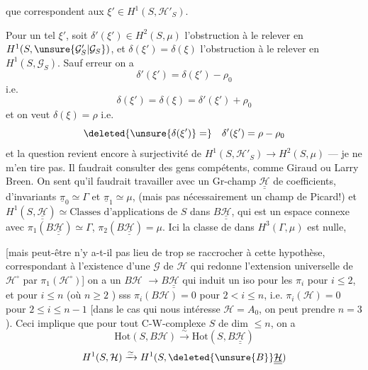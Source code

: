 que  correspondent  aux
$\xi'\in H^1(S,\mathcal H'_S)$.

Pour un tel  $\xi'$, soit
$\delta'(\xi')\in H^2(S,\mu)$
l'obstruction à le relever en $H^1(S,\unsure{\mathcal G'_S|\mathcal G_S})$,
et $\delta(\xi')=\delta(\xi)$ l'obstruction à le relever
en $H^1(S,\mathcal G_S)$. Sauf erreur on a
\[
\delta'(\xi')=\delta(\xi')-\rho_0
\]
i.e.
\[
\delta(\xi')=\delta(\xi)=\delta'(\xi')+\rho_0
\]
et on veut $\delta(\xi)=\rho$ i.e.
\[
\deleted{\unsure{\delta(\xi')}=}\quad
\delta'(\xi')=\rho-\rho_0
\]
et la question revient encore à  
surjectivité de $H^1(S,\mathcal H'_S)\longrightarrow H^2(S,\mu)$
--- je ne m'en tire pas. Il faudrait
consulter des gens compétents, comme
Giraud ou Larry Breen. On sent qu'il
faudrait travailler avec un Gr-champ $\underline{\underline{\mathcal H}}$
de coefficients, d'invariants $\underline{\pi}_0\simeq\Gamma$ et
$\underline{\pi}_1\simeq\mu$,
(mais pas nécessairement un champ de Picard!)
 et
$H^1(S,\underline{\underline{\mathcal H}})\simeq\text{Classes d'applications}$
de $S$ dans $B\underline{\underline{\mathcal H}}$, qui est un espace
connexe avec $\pi_1(B\underline{\underline{\mathcal H}})\simeq\Gamma$,
$\pi_2(B\underline{\underline{\mathcal H}})=\mu$.
Ici la classe de  dans $H^3(\Gamma,\mu)$ est nulle,

[mais peut-être n'y a-t-il pas lieu de
trop se raccrocher à cette hypothèse,
correspondant à l'existence d'une  $\mathcal G$ de $\mathcal H$
 
qui redonne l'extension universelle de
$\mathcal H^\circ$ par $\pi_1(\mathcal H^\circ)$] on a un 
$B\mathcal H$  $\longrightarrow B\underline{\underline{\mathcal H}}$
qui induit un iso pour
les $\pi_i$ pour $i\leq2$, et pour $i\leq n$
(où $n\geq2$ )
sss $\pi_i(B\mathcal H)=0$ pour $2<i\leq n$, i.e.
$\pi_i(\mathcal H)=0$ pour $2\leq i\leq n-1$ [dans le cas
qui nous intéresse $\mathcal H=A_0$, on peut
prendre $n=3$). Ceci implique que pour
tout C-W-complexe $S$ de dim $\leq n$,
on a 
\[
\mathrm{Hot}(S,B\mathcal H)\xrightarrow{\sim}
\mathrm{Hot}(S,B\underline{\underline{\mathcal H}})
\]
\[
H^1(S,\mathcal H)\xrightarrow{\simeq}
H^1(S,\deleted{\unsure{B}}\underline{\underline{\mathcal H}})
\]

